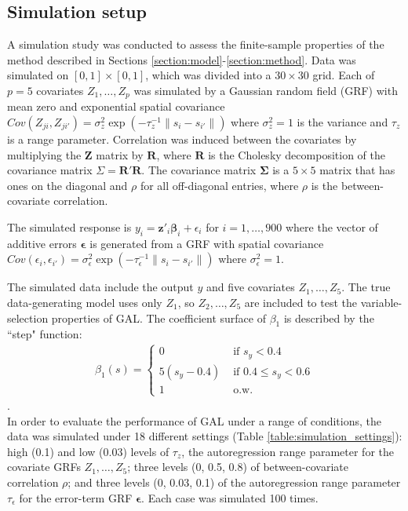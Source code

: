 \documentclass[authoryear, review, 11pt]{elsarticle}
\begin{document}
	\subsection{Simulation setup}
	A simulation study was conducted to assess the finite-sample properties of the method described in Sections \ref{section:model}-\ref{section:method}. Data was simulated on $[0,1] \times [0,1]$, which was divided into a $30 \times 30$ grid. Each of $p=5$ covariates $Z_1, \dots, Z_p$ was simulated by a Gaussian random field (GRF) with mean zero and exponential spatial covariance $Cov \left(Z_{ji}, Z_{ji'} \right) = \sigma_z^2 \exp{\left( -\tau_z^{-1} \|s_i - s_{i'} \| \right)}$ where $\sigma_z^2=1$ is the variance and $\tau_z$ is a range parameter. Correlation was induced between the covariates by multiplying the $\bm{Z}$ matrix by $\bm{R}$, where $\bm{R}$ is the Cholesky decomposition of the covariance matrix $\Sigma = \bm{R}'\bm{R}$. The covariance matrix $\bm{\Sigma}$ is a $5 \times 5$ matrix that has ones on the diagonal and $\rho$ for all off-diagonal entries, where $\rho$ is the between-covariate correlation.
		
	The simulated response is $y_i = \bm{z}'_i \bm{\beta}_i + \epsilon_i$ for $i=1, \dots, 900$ where the vector of additive errors $\bm{\epsilon}$ is generated from a GRF with spatial covariance $Cov \left(\epsilon_{i}, \epsilon_{i'} \right) = \sigma_{\epsilon}^2 \exp{\left( -\tau_{\epsilon}^{-1} \|s_i - s_{i'} \| \right)}$ where $\sigma_{\epsilon}^2=1$.
	
	The simulated data include the output $y$ and five covariates $Z_1, \dots, Z_5$. The true data-generating model uses only $Z_1$, so $Z_2, \dots, Z_5$ are included to test the variable-selection properties of GAL. The coefficient surface of $\beta_1$ is described by the ``step" function:
	\begin{eqnarray}
		\beta_1(s) = \begin{cases} 0 &\mbox{ if } s_y<0.4 \\ 5(s_y-0.4) &\mbox{ if } 0.4 \leq s_y<0.6 \\ 1 &\mbox{ o.w.} \end{cases}
	\end{eqnarray}.\\
		
	In order to evaluate the performance of GAL under a range of conditions, the data was simulated under 18 different settings (Table \ref{table:simulation_settings}): high (0.1) and low (0.03) levels of $\tau_z$, the autoregression range parameter for the covariate GRFs $Z_1, \dots, Z_5$; three levels (0, 0.5, 0.8) of between-covariate correlation $\rho$; and three levels (0, 0.03, 0.1) of the autoregression range parameter $\tau_{\epsilon}$ for the error-term GRF $\bm{\epsilon}$. Each case was simulated 100 times.
	
\end{document}
